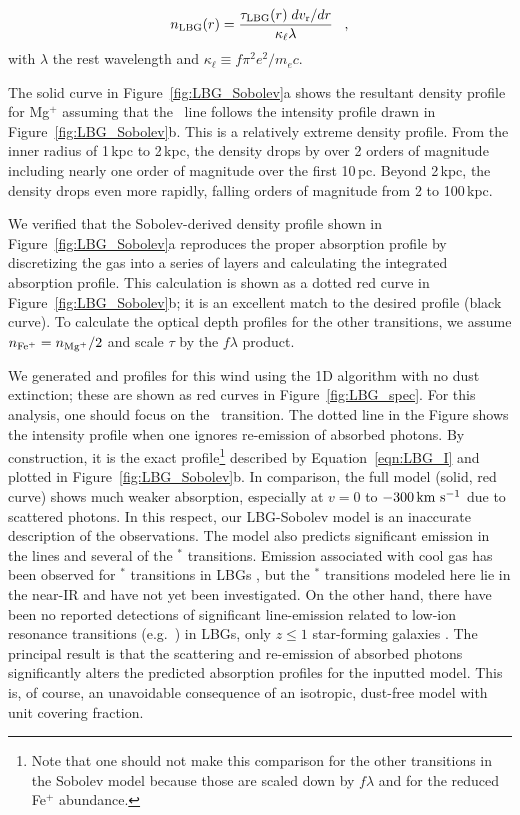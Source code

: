 \documentclass[12pt,preprint]{aastex}
\begin{document}
\begin{equation}
n_{\rm LBG}(r) = \frac{\tau_{\rm LBG}(r) \; dv_{\rm r}/dr}{\kappa_\ell
  \lambda} \;\;\; ,
\label{eqn:Sobolev}
\end{equation}
with $\lambda$ the rest wavelength and $\kappa_\ell \equiv f\pi^2
e^2/m_e c$.  

The solid curve in Figure~\ref{fig:LBG_Sobolev}a shows the
resultant density profile for Mg$^+$ assuming that the \mgiia\ line
follows the intensity profile drawn in Figure~\ref{fig:LBG_Sobolev}b. 
This is a relatively extreme density profile.  From the inner radius
of 1\,kpc to 2\,kpc, the density drops by over 2 orders of
magnitude including nearly one order of magnitude over the first
10\,pc.  Beyond 2\,kpc, the density drops even more rapidly, falling
orders of magnitude from 2 to 100\,kpc.

We verified that the Sobolev-derived density profile shown in
Figure~\ref{fig:LBG_Sobolev}a
reproduces the proper
absorption profile by discretizing the gas into a series of layers
and calculating the integrated absorption profile.  This
calculation is shown as a dotted red curve in
Figure~\ref{fig:LBG_Sobolev}b; it is an excellent
match to the desired profile (black curve).
To calculate the optical depth profiles for the other transitions, we
assume $n_{\rm Fe^+} = n_{\rm Mg^+}/2$ and scale $\tau$ by the $f\lambda$ product.

We generated  and  profiles for this wind
using the 1D algorithm with no dust extinction; these are shown as
red curves in Figure~\ref{fig:LBG_spec}.   For this analysis, one
should focus on the \mgiia\ transition.  The dotted line in the Figure
shows the intensity profile when one ignores re-emission
of absorbed photons.  By construction, it is the exact profile\footnote{Note that
  one should not make this comparison for the other transitions in
  the Sobolev model because those are scaled down by $f\lambda$ and
  for  the reduced Fe$^+$ abundance.} 
described by Equation~\ref{eqn:LBG_I} and plotted in
Figure~\ref{fig:LBG_Sobolev}b.   In comparison, the full model (solid,
red curve)
shows much weaker absorption, especially at $v = 0$ to $-300 \, {\rm km~s^{-1}}$
due to scattered photons.
In this respect, our LBG-Sobolev model is an
inaccurate description of the observations. The model
also predicts significant emission in the  lines and several of
the $^*$ transitions.   Emission associated with cool gas
has been observed for $^*$
transitions in LBGs \citep{prs+02,shapley03}, but
the $^*$ transitions
modeled here lie in the near-IR and have not yet been investigated.
On the other hand, there have been no 
reported detections of significant line-emission related to low-ion resonance
transitions (e.g.\ ) in LBGs, only $z \le 1$ star-forming galaxies
\citep{wcp+09,rwk+10}.  
The principal result is that the scattering and re-emission of
absorbed photons significantly alters the predicted absorption profiles
for the inputted model.  This is, of course, an unavoidable
consequence of an isotropic, dust-free model with unit covering
fraction.
\end{document}
